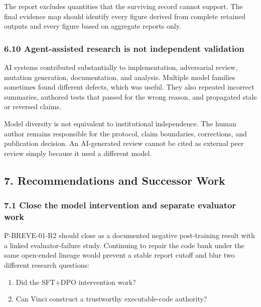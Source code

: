 \documentclass[
  9pt,
  letterpaper,
]{article}
\providecommand{\tightlist}{%
  \setlength{\itemsep}{0pt}\setlength{\parskip}{0pt}}
\begin{document}
The report excludes quantities that the surviving record cannot support.
The final evidence map should identify every figure derived from
complete retained outputs and every figure based on aggregate reports
only.

\hypertarget{610-agent-assisted-research-is-not-independent-validation}{%
\subsubsection{6.10 Agent-assisted research is not independent
validation}\label{610-agent-assisted-research-is-not-independent-validation}}

AI systems contributed substantially to implementation, adversarial
review, mutation generation, documentation, and analysis. Multiple model
families sometimes found different defects, which was useful. They also
repeated incorrect summaries, authored tests that passed for the wrong
reason, and propagated stale or reversed claims.

Model diversity is not equivalent to institutional independence. The
human author remains responsible for the protocol, claim boundaries,
corrections, and publication decision. An AI-generated review cannot be
cited as external peer review simply because it used a different model.

\hypertarget{7-recommendations-and-successor-work}{%
\subsection{7. Recommendations and Successor
Work}\label{7-recommendations-and-successor-work}}

\hypertarget{71-close-the-model-intervention-and-separate-evaluator-work}{%
\subsubsection{7.1 Close the model intervention and separate evaluator
work}\label{71-close-the-model-intervention-and-separate-evaluator-work}}

P-BREVE-01-R2 should close as a documented negative post-training result
with a linked evaluator-failure study. Continuing to repair the code
bank under the same open-ended lineage would prevent a stable report
cutoff and blur two different research questions:

\begin{enumerate}
\def\labelenumi{\arabic{enumi}.}
\tightlist
\item
  Did the SFT+DPO intervention work?
\item
  Can Vinci construct a trustworthy executable-code authority?
\end{enumerate}
\end{document}
